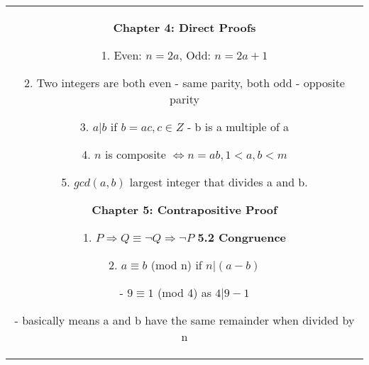 \documentclass[a4paper]{article}
\begin{document}
\begin{tabular}{@{}c@{}}
\begin{minipage}[t][\paperheight][t]{0.5\paperwidth}
        \textbf{Chapter 4: Direct Proofs}

        1. Even: $n = 2a$, Odd:  $n = 2a + 1$

        2. Two integers are both even - same parity, both odd - opposite parity

        3. $a | b$ if  $b = ac, c \in Z$ - b is a multiple of a

        4.  $n$ is composite $\iff n = ab, 1 <a,b<m$ 

        5. $gcd(a,b)$ largest integer that divides a and b. 

        \textbf{Chapter 5: Contrapositive Proof}


        1. $P \Rightarrow Q \equiv \neg Q \Rightarrow \neg P$ 
        \textbf{5.2 Congruence}

        2. $a \equiv b$ (mod n)  if  $n | (a - b)$ 

        \quad - $9 \equiv 1$ (mod 4) as $4 | 9 - 1$

        \quad - basically means a and b have the same remainder when divided by n







    \end{minipage}%
    \end{tabular}%
\end{document}
